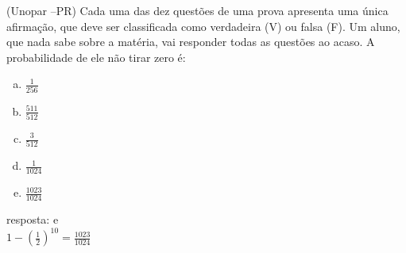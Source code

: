 \begin{ex}
(Unopar –PR) Cada uma das dez questões de uma prova apresenta uma única afirmação, que deve ser classificada como verdadeira (V) ou falsa (F). Um aluno, que nada sabe sobre a matéria, vai responder todas as questões ao acaso. A probabilidade de ele não tirar zero é:
   \begin{enumerate}[(a)]
   \item $\frac{1}{256}$
   \item $\frac{511}{512}$
   \item $\frac{3}{512}$
   \item $\frac{1}{1024}$
   \item $\frac{1023}{1024}$
   \end{enumerate}
     \begin{sol}
      resposta: e \\
      $1-(\frac{1}{2})^{10}=\frac{1023}{1024}$
     \end{sol}
\end{ex}